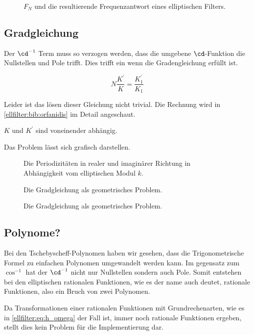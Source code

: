 \begin{figure}
    \centering
    
    \caption{$F_N$ und die resultierende Frequenzantwort eines elliptischen Filters.}
    \label{ellfilter:fig:elliptic_freq}
\end{figure}

\subsection{Gradgleichung}

Der $\cd^{-1}$ Term muss so verzogen werden, dass die umgebene $\cd$-Funktion die Nullstellen und Pole trifft.
Dies trifft ein wenn die Gradengleichung erfüllt ist.

\begin{equation}
    N \frac{K^\prime}{K} = \frac{K^\prime_1}{K_1}
\end{equation}


Leider ist das lösen dieser Gleichung nicht trivial.
Die Rechnung wird in \ref{ellfilter:bib:orfanidis} im Detail angeschaut.

$K$ und $K^\prime$ sind voneinender abhängig.

Das Problem lässt sich grafisch darstellen.

\begin{figure}
    \centering
    
    \caption{Die Periodizitäten in realer und imaginärer Richtung in Abhängigkeit vom elliptischen Modul $k$.}
\end{figure}

\begin{figure}
    \centering
    
    \caption{Die Gradgleichung als geometrisches Problem.}
\end{figure}
\begin{figure}
    \centering
    
    \caption{Die Gradgleichung als geometrisches Problem.}
\end{figure}

\subsection{Polynome?}

Bei den Tschebyscheff-Polynomen haben wir gesehen, dass die Trigonometrische Formel zu einfachen Polynomen umgewandelt werden kann.
Im gegensatz zum $\cos^{-1}$ hat der $\cd^{-1}$ nicht nur Nullstellen sondern auch Pole.
Somit entstehen bei den elliptischen rationalen Funktionen, wie es der name auch deutet, rationale Funktionen, also ein Bruch von zwei Polynomen.

Da Transformationen einer rationalen Funktionen mit Grundrechenarten, wie es in \eqref{ellfilter:eq:h_omega} der Fall ist, immer noch rationale Funktionen ergeben, stellt dies kein Problem für die Implementierung dar.
